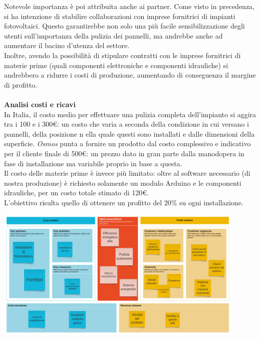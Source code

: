 \documentclass[a4paper, 12pt]{article}
\begin{document}
	Notevole importanza è poi attribuita anche ai partner. Come visto in precedenza, si ha intenzione di stabilire collaborazioni con imprese fornitrici di impianti fotovoltaici. Questo garantirebbe non solo una più facile sensibilizzazione degli utenti sull'importanza della pulizia dei pannelli, ma andrebbe anche ad aumentare il bacino d'utenza del settore.\\ %
	Inoltre, avendo la possibilità di stipulare contratti con le imprese fornitrici di materie prime (quali componenti elettroniche e componenti idrauliche) si andrebbero a ridurre i costi di produzione, aumentando di conseguenza il margine di profitto.\\\\
	\textbf{Analisi costi e ricavi}\\
	In Italia, il costo medio per effettuare una pulizia completa dell'impianto si aggira tra i 100 e i 300\euro: un costo che varia a seconda della condizione in cui versano i pannelli, della posizione n ella quale questi sono installati e dalle dimensioni della superficie. \emph{Osmos} punta a fornire un prodotto dal costo complessivo e indicativo per il cliente finale di 500\euro: un prezzo dato in gran parte dalla manodopera in fase di installazione ma variabile proprio in base a questa.\\
	Il costo delle materie prime è invece più limitato: oltre al software necessario (di nostra produzione) è richiesto solamente un modulo Arduino e le componenti idrauliche, per un costo totale stimato di 120\euro.\\
	L'obiettivo risulta quello di ottenere un profitto del 20\% su ogni installazione.
	\begin{center}
		\includegraphics[width=0.9\textwidth]{Images/BusinessModelCanvas.png}
	\end{center}
\end{document}
